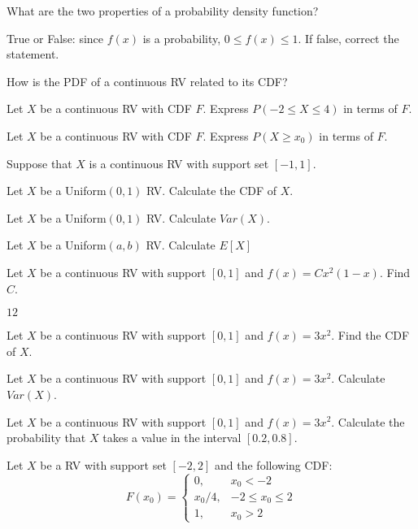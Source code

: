 \documentclass[addpoints,12pt]{exam}
\begin{document}
\begin{questions}
\question What are the two properties of a probability density function? 

\question True or False: since $f(x)$ is a probability, $0\leq f(x) \leq 1$. If false, correct the statement.

\question How is the PDF of a continuous RV related to its CDF?

\question Let $X$ be a continuous RV with CDF $F$. Express $P(-2 \leq X \leq 4)$ in terms of $F$.

\question Let $X$ be a continuous RV with CDF $F$. Express $P(X \geq x_0)$ in terms of $F$.

\question Suppose that $X$ is a continuous RV with support set $[-1,1]$.

\question Let $X$ be a Uniform$(0,1)$ RV. Calculate the CDF of $X$.

\question Let $X$ be a Uniform$(0,1)$ RV. Calculate $Var(X)$.

\question Let $X$ be a Uniform$(a,b)$ RV. Calculate $E[X]$

\question Let $X$ be a continuous RV with support $[0,1]$ and $f(x) = C x^2(1 - x)$. Find $C$.
\begin{solution}
  $12$
\end{solution}

\question Let $X$ be a continuous RV with support $[0,1]$ and $f(x) = 3x^2$. Find the CDF of $X$.

\question Let $X$ be a continuous RV with support $[0,1]$ and $f(x) = 3x^2$. Calculate $Var(X)$.

\question Let $X$ be a continuous RV with support $[0,1]$ and $f(x) = 3x^2$. Calculate the probability that $X$ takes a value in the interval $[0.2, 0.8]$.

\question Let $X$ be a RV with support set $[-2,2]$ and the following CDF:
\[
  F(x_0) = \left\{
  \begin{array}{rr}
    0, & x_0 < -2\\
    x_0/4, & -2 \leq x_0 \leq 2\\
    1, & x_0 > 2
  \end{array}
  \right.
\]
\begin{parts}

\end{parts}
\end{questions}
\end{document}
